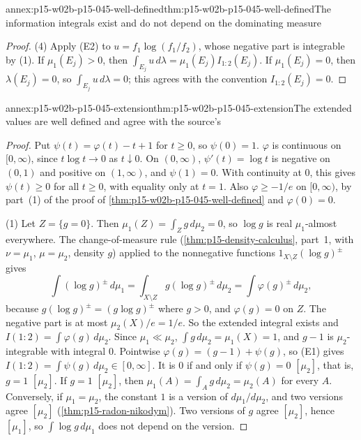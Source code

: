 \begin{annexitem}{annex:p15-w02b-p15-045-well-defined}{thm:p15-w02b-p15-045-well-defined}{The information integrals exist and do not depend on the dominating measure}
\begin{proof}
(4) Apply (E2) to \(u=f_1\log(f_1/f_2)\), whose negative part is
integrable by (1). If \(\mu_1(E_j)>0\), then
\(\int_{E_j}u\,d\lambda=\mu_1(E_j)I_{1:2}(E_j)\). If \(\mu_1(E_j)=0\),
then \(\lambda(E_j)=0\), so \(\int_{E_j}u\,d\lambda=0\); this agrees with
the convention \(I_{1:2}(E_j)=0\).
\end{proof}
\end{annexitem}

\begin{annexitem}{annex:p15-w02b-p15-045-extension}{thm:p15-w02b-p15-045-extension}{The extended values are well defined and agree with the source's}
\begin{proof}
Put \(\psi(t)=\varphi(t)-t+1\) for \(t\geq0\), so \(\psi(0)=1\).
\(\varphi\) is continuous on \([0,\infty)\), since \(t\log t\to0\) as
\(t\downarrow0\). On \((0,\infty)\), \(\psi'(t)=\log t\) is negative on
\((0,1)\) and positive on \((1,\infty)\), and \(\psi(1)=0\). With
continuity at \(0\), this gives \(\psi(t)\geq0\) for all \(t\geq0\),
with equality only at \(t=1\). Also \(\varphi\geq-1/e\) on
\([0,\infty)\), by part~(1) of the proof of
\cref{thm:p15-w02b-p15-045-well-defined} and \(\varphi(0)=0\).

(1) Let \(Z=\{g=0\}\). Then \(\mu_1(Z)=\int_Zg\,d\mu_2=0\), so
\(\log g\) is real \(\mu_1\)-almost everywhere. The change-of-measure
rule (\cref{thm:p15-density-calculus}, part~1, with \(\nu=\mu_1\),
\(\mu=\mu_2\), density \(g\)) applied to the nonnegative functions
\(1_{X\setminus Z}(\log g)^\pm\) gives
\[
  \int(\log g)^\pm\,d\mu_1=\int_{X\setminus Z}g(\log g)^\pm\,d\mu_2
  =\int\varphi(g)^\pm\,d\mu_2,
\]
because \(g(\log g)^\pm=(g\log g)^\pm\) where \(g>0\), and
\(\varphi(g)=0\) on \(Z\). The negative part is at most
\(\mu_2(X)/e=1/e\). So the extended integral exists and
\(I(1:2)=\int\varphi(g)\,d\mu_2\). Since \(\mu_1\ll\mu_2\),
\(\int g\,d\mu_2=\mu_1(X)=1\), and \(g-1\) is \(\mu_2\)-integrable with
integral \(0\). Pointwise \(\varphi(g)=(g-1)+\psi(g)\), so (E1) gives
\(I(1:2)=\int\psi(g)\,d\mu_2\in[0,\infty]\). It is \(0\) if and only if
\(\psi(g)=0\) \([\mu_2]\), that is, \(g=1\) \([\mu_2]\). If \(g=1\)
\([\mu_2]\), then \(\mu_1(A)=\int_Ag\,d\mu_2=\mu_2(A)\) for every
\(A\). Conversely, if \(\mu_1=\mu_2\), the constant \(1\) is a version of
\(d\mu_1/d\mu_2\), and two versions agree \([\mu_2]\)
(\cref{thm:p15-radon-nikodym}). Two versions of \(g\) agree
\([\mu_2]\), hence \([\mu_1]\), so \(\int\log g\,d\mu_1\) does not
depend on the version.


\end{proof}
\end{annexitem}
